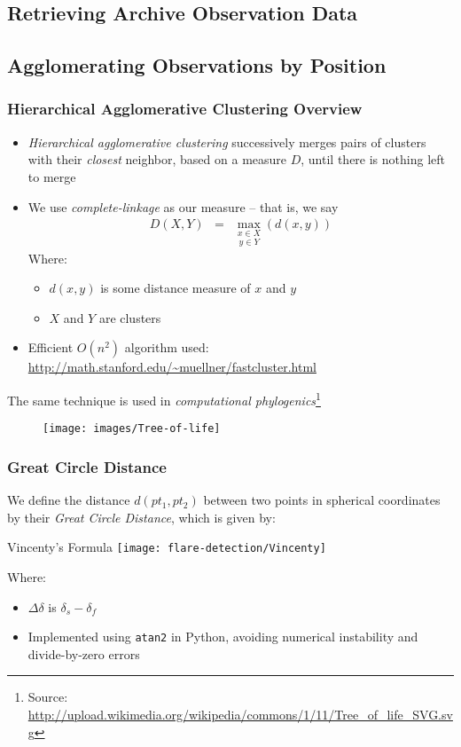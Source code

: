 \subsection{Retrieving Archive Observation Data}
\subsection{Agglomerating Observations by Position}
\begin{frame}[allowframebreaks]
\frametitle{Hierarchical Agglomerative Clustering Overview}
\begin{itemize}
	\item \emph{Hierarchical agglomerative clustering} successively merges pairs of clusters with their \emph{closest} neighbor, based on a measure $D$, until there is nothing left to merge
	\item We use \emph{complete-linkage} as our measure -- that is, we say
\begin{eqnarray*}
  D (X, Y) & = & \underset{y \in Y}{\underset{x \in X}{\max}} (d (x, y))
\end{eqnarray*}
	Where:
	\begin{itemize}
		\item $d(x,y)$ is some distance measure of $x$ and $y$
		\item $X$ and $Y$ are clusters
	\end{itemize}
	\item Efficient $O(n^2)$ algorithm used:\\
	{\small \url{http://math.stanford.edu/~muellner/fastcluster.html}}
\end{itemize}
\framebreak
	The same technique is used in \emph{computational phylogenics}\footnote{Source: \url{http://upload.wikimedia.org/wikipedia/commons/1/11/Tree_of_life_SVG.svg}}
\begin{figure}[h,b]
\centering
\texttt{[image: images/Tree-of-life]}
\end{figure}
\end{frame}
	
\begin{frame}
\frametitle{Great Circle Distance}
	We define the distance $d(pt_1,pt_2)$ between two points in spherical coordinates by their \emph{Great Circle Distance}, which is given by:
\begin{block}{Vincenty's Formula}
\texttt{[image: flare-detection/Vincenty]}
\end{block}
Where:
\begin{itemize}
\item $\Delta \delta$ is $\delta_s-\delta_f$
\item Implemented using \texttt{atan2} in Python, avoiding numerical instability and divide-by-zero errors
\end{itemize}
\end{frame}
